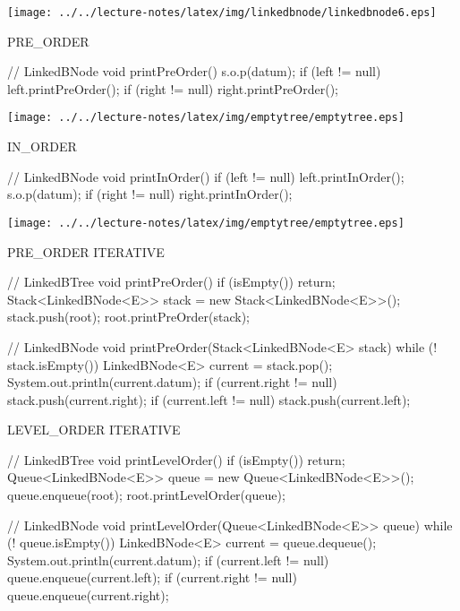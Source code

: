 \documentclass[a4paper, 10pt]{article}
\begin{document}
\begin{minipage}{0.6\linewidth}
  \begin{center}
\texttt{[image: ../../lecture-notes/latex/img/linkedbnode/linkedbnode6.eps]}
\begin{multicols}{2}
\begin{blackboard}
      PRE_ORDER

// LinkedBNode
void printPreOrder() {
  s.o.p(datum);
  if (left != null) {
    left.printPreOrder();
  }
  if (right != null) {
    right.printPreOrder();
  }
}
\end{blackboard}
\columnbreak
\texttt{[image: ../../lecture-notes/latex/img/emptytree/emptytree.eps]}
\end{multicols}
\begin{multicols}{2}
\begin{blackboard}
      IN_ORDER

// LinkedBNode
void printInOrder() {
  if (left != null) {
    left.printInOrder();
  }
  s.o.p(datum);
  if (right != null) {
    right.printInOrder();
  }
}
\end{blackboard}
\columnbreak
\texttt{[image: ../../lecture-notes/latex/img/emptytree/emptytree.eps]}
\end{multicols}
\end{center}
\end{minipage}


\begin{minipage}{0.48\linewidth}
\begin{blackboard}
      PRE_ORDER ITERATIVE

// LinkedBTree
void printPreOrder() {
  if (isEmpty()) {
    return;
  }
  Stack<LinkedBNode<E>> stack =
                   new Stack<LinkedBNode<E>>();
  stack.push(root);
  root.printPreOrder(stack);
}

// LinkedBNode
void printPreOrder(Stack<LinkedBNode<E> stack) {
  while (! stack.isEmpty()) {
    LinkedBNode<E> current = stack.pop();
    System.out.println(current.datum);
    if (current.right != null) {
      stack.push(current.right);
    }
    if (current.left != null) {
      stack.push(current.left);
    }
  }
}
\end{blackboard}
\end{minipage}
\begin{minipage}{0.48\linewidth}
\begin{blackboard}
      LEVEL_ORDER ITERATIVE

// LinkedBTree
void printLevelOrder() {
  if (isEmpty()) {
    return;
  }
  Queue<LinkedBNode<E>> queue =
                   new Queue<LinkedBNode<E>>();
  queue.enqueue(root);
  root.printLevelOrder(queue);
}

// LinkedBNode
void printLevelOrder(Queue<LinkedBNode<E>> queue) {
  while (! queue.isEmpty()) {
    LinkedBNode<E> current = queue.dequeue();
    System.out.println(current.datum);
    if (current.left != null) {
      queue.enqueue(current.left);
    }
    if (current.right != null) {
      queue.enqueue(current.right);
    }
  }
}
\end{blackboard}
\end{minipage}
\end{document}
